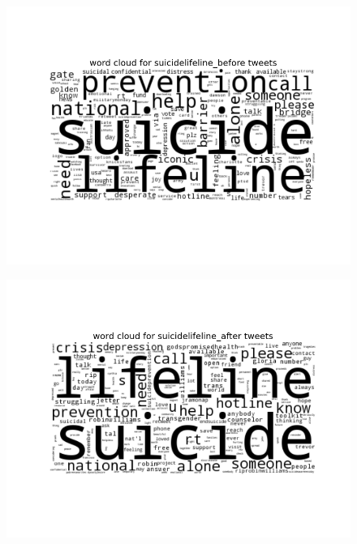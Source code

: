 \documentclass[11pt, oneside]{article}   	%
\begin{document}
 \begin{figure}
 \includegraphics[width=\textwidth]{../figures/suicidelifeline_before.png}
 \centering
 \end{figure}

 \begin{figure}
 \includegraphics[width=\textwidth]{../figures/suicidelifeline_after.png}
 \centering
 \end{figure}
\end{document}

